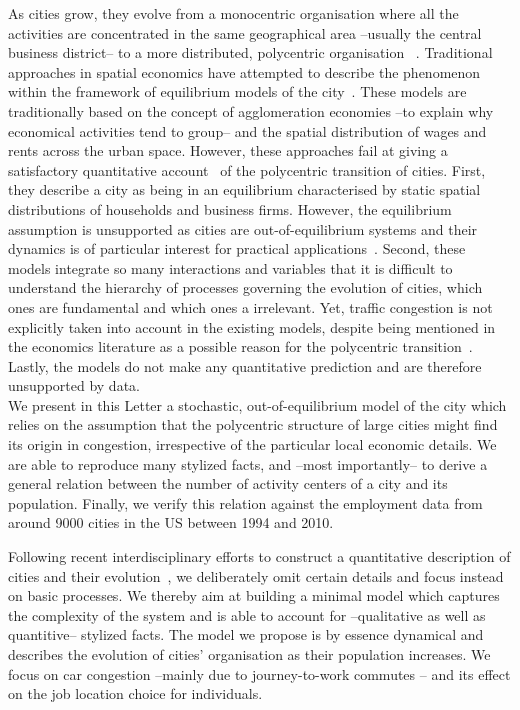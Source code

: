 As cities grow, they evolve from a monocentric organisation where all
the activities are concentrated in the same geographical area
--usually the central business district-- to a more distributed,
polycentric organisation
~\cite{Kemper:1974,Odland:1978,Mills:1972,Griffith_PG:1981,Dokmeci:1994,McMillen:2003,Pereira:2013,Roth:2011}. Traditional
approaches in spatial economics have attempted to describe the
phenomenon within the framework of equilibrium models of the city~\cite{Fujita:1982,Fujita:book1999}. These models are traditionally
based on the concept of agglomeration economies --to explain why
economical activities tend to group-- and the spatial distribution of
wages and rents across the urban space. However, these approaches fail
at giving a satisfactory quantitative
account~\cite{Bouchaud:2008,Batty:2008} of the polycentric transition
of cities. First, they describe a city as being in an equilibrium
characterised by static spatial distributions of households and business
firms. However, the equilibrium assumption is unsupported as cities
are out-of-equilibrium systems and their
dynamics is of particular interest for practical
applications~\cite{Batty:2008}. Second, these models integrate so many
interactions and variables that it is difficult to understand the
hierarchy of processes governing the evolution of cities, which ones are fundamental and which ones a irrelevant. Yet, traffic congestion is not
explicitly taken into account in the existing models, despite being
mentioned in the economics literature as a possible reason for the
polycentric transition~\cite{McMillen:2003}. Lastly, the models do
not make any quantitative prediction and are therefore unsupported by
data.\\ 
We present in this Letter a stochastic, out-of-equilibrium model of the
city which relies on the assumption that the polycentric structure of
large cities might find its origin in congestion, irrespective of the
particular local economic details. We are able to reproduce many
stylized facts, and --most importantly-- to derive a general relation
between the number of activity centers of a city and its
population. Finally, we verify this relation against the employment
data from around 9000 cities in the US between 1994 and 2010.


Following recent interdisciplinary efforts to construct a quantitative
description of cities and their
evolution~\cite{Makse:1995,Zanette:1997,Marsili:1998a,Marsili:1998b,Batty:book2005,Bettencourt:2007,Batty:2008},
we deliberately omit certain details and focus instead on basic
processes. We thereby aim at building a minimal model which captures
the complexity of the system and is able to account for --qualitative as well as quantitive-- stylized
facts. The model we propose is by essence dynamical and describes the
evolution of cities' organisation as their population increases. We
focus on car congestion --mainly due to journey-to-work commutes --
and its effect on the job location choice for individuals.

